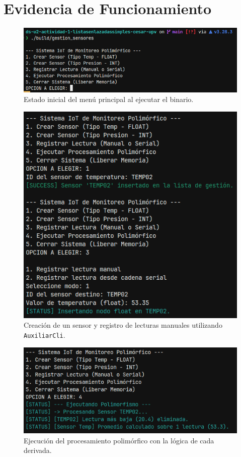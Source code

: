 \documentclass[11pt,a4paper]{article}
\begin{document}
\section{Evidencia de Funcionamiento}

\begin{figure}[h]
    \centering
    \includegraphics[width=0.8\linewidth]{alIniciarPrograma.png}
    \caption{Estado inicial del menú principal al ejecutar el binario.}
    \label{fig:inicio}
\end{figure}

\begin{figure}[h]
    \centering
    \includegraphics[width=0.8\linewidth]{crearSensorYLectura.png}
    \caption{Creación de un sensor y registro de lecturas manuales utilizando \texttt{AuxiliarCli}.}
    \label{fig:crear}
\end{figure}

\begin{figure}[h]
    \centering
    \includegraphics[width=0.8\linewidth]{ejecutarProcesamientoPolimorfico.png}
    \caption{Ejecución del procesamiento polimórfico con la lógica de cada derivada.}
    \label{fig:procesar}
\end{figure}
\end{document}

